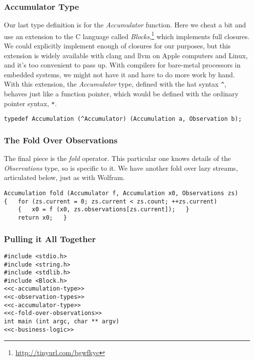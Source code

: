 \documentclass[10pt,oneside,x11names]{article}
\begin{document}
\subsubsection{Accumulator Type}
\label{sec:orgheadline4}

Our last type definition is for the \emph{Accumulator} function. Here we cheat a bit
and use an extension to the C language called \emph{Blocks},\footnote{\url{http://tinyurl.com/bgwfkyc}} which
implements full closures. We could explicitly implement enough of closures for
our purposes, but this extension is widely available with clang and llvm on
Apple computers and Linux, and it's too convenient to pass up. With compilers
for bare-metal processors in embedded systems, we might not have it and have to
do more work by hand. With this extension, the \emph{Accumulator} type, defined with
the hat syntax \texttt{\textasciicircum{}}, behaves just like a function pointer, which would be defined
with the ordinary pointer syntax, \texttt{*}.

\begin{verbatim}
typedef Accumulation (^Accumulator) (Accumulation a, Observation b);
\end{verbatim}

\subsubsection{The Fold Over Observations}
\label{sec:orgheadline5}

The final piece is the \emph{fold} operator. This particular one knows details of the
\emph{Observations} type, so is specific to it. We have another fold over lazy
streams, articulated below, just as with Wolfram.

\begin{verbatim}
Accumulation fold (Accumulator f, Accumulation x0, Observations zs)
{   for (zs.current = 0; zs.current < zs.count; ++zs.current)
    {   x0 = f (x0, zs.observations[zs.current]);   }
    return x0;   }
\end{verbatim}

\subsubsection{Pulling it All Together}
\label{sec:orgheadline6}

\begin{verbatim}
#include <stdio.h>
#include <string.h>
#include <stdlib.h>
#include <Block.h>
<<c-accumulation-type>>
<<c-observation-types>>
<<c-accumulator-type>>
<<c-fold-over-observations>>
int main (int argc, char ** argv)
<<c-business-logic>>
\end{verbatim}
\end{document}
